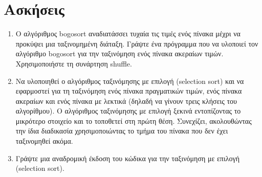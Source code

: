 \section{Ασκήσεις}
\begin{enumerate}
\item Ο αλγόριθμος bogosort αναδιατάσσει τυχαία τις τιμές ενός πίνακα μέχρι να προκύψει μια ταξινομημένη διάταξη. Γράψτε ένα πρόγραμμα που να υλοποιεί τον αλγόριθμο bogosort για την ταξινόμηση ενός πίνακα ακεραίων τιμών. Χρησιμοποιήστε τη συνάρτηση shuffle. 
\item Να υλοποιηθεί ο αλγόριθμος ταξινόμησης με επιλογή (selection sort) και να εφαρμοστεί για τη ταξινόμηση ενός πίνακα πραγματικών τιμών, ενός πίνακα ακεραίων και ενός πίνακα με λεκτικά (δηλαδή να γίνουν τρεις κλήσεις του αλγορίθμου). Ο αλγόριθμος ταξινόμησης με επιλογή ξεκινά εντοπίζοντας το μικρότερο στοιχείο και το τοποθετεί στη πρώτη θέση. Συνεχίζει, ακολουθώντας την ίδια διαδικασία χρησιμοποιώντας το τμήμα του πίνακα που δεν έχει ταξινομηθεί ακόμα. 
\item Γράψτε μια αναδρομική έκδοση του κώδικα για την ταξινόμηση με επιλογή (selection sort).

\end{enumerate}






